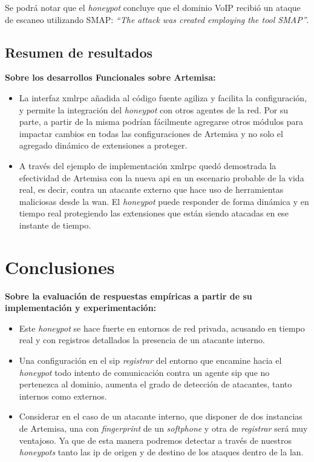 \documentclass[a4paper,12pt]{report}
\begin{document}
Se podrá notar que el \emph{honeypot} concluye que el dominio VoIP recibió un
ataque de escaneo utilizando SMAP: \emph{``The attack was created employing the tool SMAP''}.

\subsection{Resumen de resultados}

\textbf{Sobre los desarrollos Funcionales sobre Artemisa:}

\begin{itemize}
\item{La interfaz \ac{xmlrpc} añadida al código fuente agiliza y facilita la
configuración, y permite la integración del \emph{honeypot} con otros agentes de la
red. Por su parte, a partir de la misma podrían fácilmente agregarse otros módulos para impactar
cambios en todas las configuraciones de Artemisa y no solo el agregado dinámico de extensiones 
a proteger.}

\item{A través del ejemplo de implementación \ac{xmlrpc} quedó demostrada la efectividad de Artemisa con
la nueva \ac{api} en un escenario probable de la vida real, es decir, contra un atacante externo
que hace uso de herramientas maliciosas desde la \ac{wan}. El \emph{honeypot} puede responder 
de forma dinámica y en tiempo real protegiendo las extensiones que están siendo atacadas en ese 
instante de tiempo.}
\end{itemize}

\clearpage

\section{Conclusiones}

\textbf{Sobre la evaluación de respuestas empíricas a partir de su implementación y
experimentación:}

\begin{itemize}
\item{Este \emph{honeypot} se hace fuerte en entornos de red privada, acusando en
tiempo real y con registros detallados la presencia de un atacante interno.}

\item{Una configuración en el \ac{sip} \emph{registrar} del entorno que encamine hacia
el \emph{honeypot} todo intento de comunicación contra un agente \ac{sip} que no 
pertenezca al dominio, aumenta el grado de detección de atacantes, tanto internos como
externos.}

\item{Considerar en el caso de un atacante interno, que disponer de dos instancias de Artemisa,
una con \emph{fingerprint} de un \emph{softphone} y otra de \emph{registrar} será muy ventajoso.
Ya que de esta manera podremos detectar a través de nuestros \emph{honeypots} tanto las \ac{ip} de
origen y de destino de los ataques dentro de la \ac{lan}}. 
\end{itemize}
\end{document}
